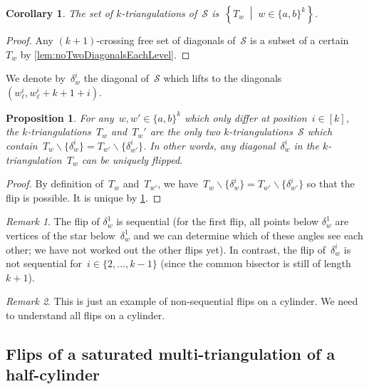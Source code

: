 \documentclass{amsart}
\newtheorem{proposition}[theorem]{Proposition}
\newtheorem{corollary}[theorem]{Corollary}
\theoremstyle{remark}
\newtheorem{remark}{Remark}[section]
\newcommand{\set}[2]{\left\{ #1 \;\middle|\; #2 \right\}} %
\newcommand{\ssm}{\smallsetminus} %
\newcommand{\surface}{\mathcal{S}}
\begin{document}
\begin{corollary}
\label{coro:allkTriangCyclinder}
The set of $k$-triangulations of~$\surface$ is~$\set{T_w}{w \in \{a,b\}^k}$.
\end{corollary}

\begin{proof}
Any $(k+1)$-crossing free set of diagonals of~$\surface$ is a subset of a certain~$T_w$ by \cref{lem:noTwoDiagonalsEachLevel}.
\end{proof}

We denote by~$\delta_w^i$ the diagonal of~$\surface$ which lifts to the diagonals~$(w^i_\ell, w^i_{\ell}+k+1+i)$.

\begin{proposition}
For any~$w, w' \in \{a,b\}^k$ which only differ at position~$i \in [k]$, the $k$-triangulations~$T_w$ and~$T_w'$ are the only two $k$-triangulations~$\surface$ which contain~${T_w \ssm \{\delta_w^i\} = T_{w'} \ssm \{\delta_{w'}^i\}}$. In other words, any diagonal~$\delta_w^i$ in the $k$-triangulation~$T_w$ can be uniquely flipped.
\end{proposition}

\begin{proof}
By definition of~$T_w$ and~$T_{w'}$, we have~${T_w \ssm \{\delta_w^i\} = T_{w'} \ssm \{\delta_{w'}^i\}}$ so that the flip is possible.
It is unique by \cref{coro:allkTriangCyclinder}.
\end{proof}

\begin{remark}
The flip of $\delta_w^1$ is sequential (for the first flip, all points below $\delta_w^1$ are vertices of the star below~$\delta_w^1$ and we can determine which of these angles see each other; we have not worked out the other flips yet).
In contrast, the flip of~$\delta_w^i$ is not sequential for~$i \in \{2, \dots, k-1\}$ (since the common bisector is still of length~$k+1$).
\end{remark}

\begin{remark}
This is just an example of non-sequential flips on a cylinder. We need to understand all flips on a cylinder.
\end{remark}


\subsection{Flips of a saturated multi-triangulation of a half-cylinder}
\end{document}
